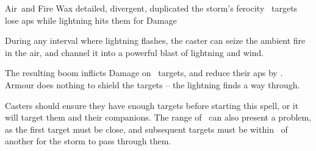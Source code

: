   {Air\ and Fire}%
  {Wax}%
  {detailed, divergent, duplicated}%
  {the storm's ferocity}%
  {\spellArea\ targets lose  \glspl{ap} while lightning hits them for  Damage}%
  {
    During any \gls{interval} where lightning flashes, the caster can seize the ambient fire in the air, and channel it into a powerful blast of lightning and wind.

    The resulting boom inflicts  Damage on \spellArea\ targets, and reduce their \glspl{ap} by .
    Armour does nothing to shield the targets -- the lightning finds a way through.

    Casters should ensure they have enough targets before starting this spell, or it will target them and their companions.
    The range of \spellRange\ can also present a problem, as the first target must be close, and subsequent targets must be within \spellRange\ of another for the storm to pass through them.
  }
